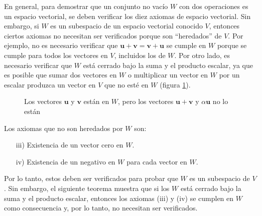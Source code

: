 En general, para demostrar que un conjunto no vacío $W$ con dos operaciones es un espacio vectorial, se deben verificar los diez axiomas de espacio vectorial. Sin embargo, si $W$ es un subespacio de un espacio vectorial conocido $V$, entonces ciertos axiomas no necesitan ser verificados porque son “heredados” de $V$. Por ejemplo, no es necesario verificar que $\mathbf{u} + \mathbf{v} = \mathbf{v} + \mathbf{u}$ se cumple en $W$ porque se cumple para todos los vectores en $V$, incluidos los de $W$. Por otro lado, es necesario verificar que $W$ está cerrado bajo la suma y el producto escalar, ya que es posible que sumar dos vectores en $W$ o multiplicar un vector en $W$ por un escalar produzca un vector en $V$ que no esté en $W$ (figura \ref{JAJJAJAJAJJQJQOOQPQZ}).
\begin{figure}[H]
    \centering
    \caption{Los vectores $\mathbf{u}$ y $\mathbf{v}$ están en $W$, pero los vectores $\mathbf{u} + \mathbf{v}$ y $\alpha \mathbf{u}$ no lo están}
    \label{JAJJAJAJAJJQJQOOQPQZ}
\end{figure}
\noindent Los axiomas que no son heredados por $W$ son:
\begin{enumerate}
    \item[iii)] Existencia de un vector cero en $W$.
    \item[iv)] Existencia de un negativo en $W$ para cada vector en $W$.
\end{enumerate}
Por lo tanto, estos deben ser verificados para probar que $W$ es un subespacio de $V$. Sin embargo, el siguiente teorema muestra que si los $W$ está cerrado bajo la suma y el producto escalar, entonces los axiomas (iii) y (iv) se cumplen en $W$ como consecuencia y, por lo tanto, no necesitan ser verificados.

